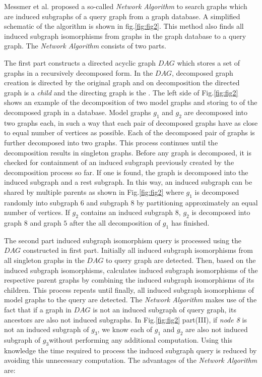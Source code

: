 Messmer et al.\cite{messmer_bunke2000} proposed a so-called \textit{Network Algorithm} to search graphs which are induced subgraphs of a query graph from a graph database. 
A simplified schematic of the algorithm is shown in fig.\ref{fig:fig2}. 
This method also finds all induced subgraph isomorphisms from graphs in the graph database to a query graph.
The \textit{Network Algorithm} consists of two parts.

The first part constructs a directed acyclic graph $DAG$ which stores a set of graphs in a recursively decomposed form.
In the $DAG$,  decomposed graph creation is directed by the original graph and on decomposition 
the directed graph is a \textit{child} and the directing graph is the . 
The left side of Fig.\ref{fig:fig2} shows an example of the decomposition of two model graphs and storing to of the decomposed graph in a database.
Model graphs $g_1$ and $g_2$ are decomposed into two graphs each, in such a way that each pair of decomposed graphs have as close to equal number of vertices  as possible.
Each of the decomposed pair of graphs is further decomposed into two graphs.
This process continues until the decomposition results in singleton graphs.
Before any graph is decomposed, it is checked for containment of an induced subgraph previously created by the decomposition process so far. If one is found, the graph is decomposed into the induced subgraph and a rest subgraph. In this way, an induced subgraph can be shared by multiple parents as shown in Fig.\ref{fig:fig2} where $g_1$ is decomposed randomly into subgraph $6$ and subgraph $8$ by partitioning approximately an equal number of vertices.
If $g_2$ contains an induced subgraph $8$, $g_2$ is decomposed into graph $8$ and graph $5$ after the all decomposition of $g_1$ has finished.

The second part induced subgraph isomorphism query is processed using the $DAG$ constructed in first part.
Initially all induced subgraph isomorphisms from all singleton graphs in the $DAG$ to query graph are detected.
Then, based on the induced subgraph isomorphisms, calculates induced subgraph isomorphisms of the respective parent graphs by combining the induced subgraph isomorphisms of its children. This process repeats until finally, all induced subgraph isomorphisms of model graphs to the query are detected.
The \textit{Network Algorithm} makes use of the fact that if a graph in $DAG$ is not an induced subgraph of query graph, its ancestors are also not induced subgraphs.
In Fig.\ref{fig:fig2} part(III), if \textit{node 8} is not an induced subgraph of $g_3$, we know each of $g_1$ and $g_2$ are also not induced subgraph of $g_3$without performing any additional computation. Using this knowledge the time required to process the induced subgraph query is reduced by avoiding this unnecessary computation. The advantages of the \textit{Network Algorithm}  are:  

